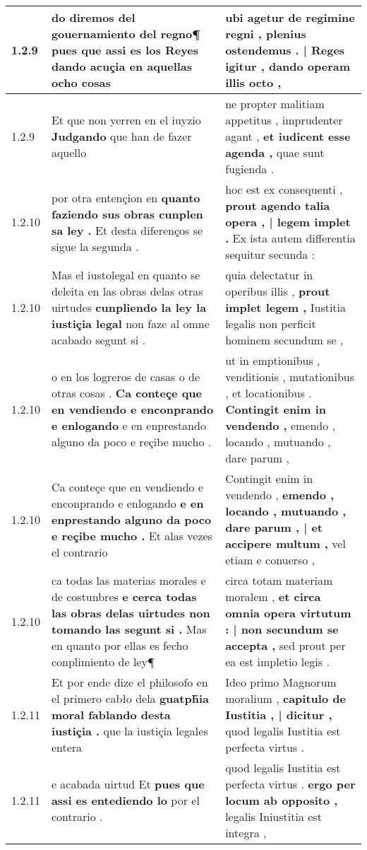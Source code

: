 \begin{tabular}{|p{1cm}|p{6.5cm}|p{6.5cm}|}
1.2.9 & do diremos del gouernamiento del regno¶ \textbf{ pues que assi es los Reyes dando acuçia } en aquellas ocho cosas & ubi agetur de regimine regni , \textbf{ plenius ostendemus . | Reges igitur , } dando operam illis octo , \\\hline
1.2.9 & Et que non yerren en el iuyzio \textbf{ Judgando } que han de fazer aquello & ne propter malitiam appetitus , imprudenter agant , \textbf{ et iudicent esse agenda , } quae sunt fugienda . \\\hline
1.2.10 & por otra entençion en \textbf{ quanto faziendo sus obras cunplen sa ley . } Et desta diferenços se sigue la segunda . & hoc est ex consequenti , \textbf{ prout agendo talia opera , | legem implet . } Ex ista autem differentia sequitur secunda : \\\hline
1.2.10 & Mas el iustolegal en quanto se deleita en las obras delas otras uirtudes \textbf{ cunpliendo la ley la iustiçia legal } non faze al omne acabado segunt si . & quia delectatur in operibus illis , \textbf{ prout implet legem , } Iustitia legalis non perficit hominem secundum se , \\\hline
1.2.10 & o en los logreros de casas o de otras cosas . \textbf{ Ca conteçe que en vendiendo e enconprando e enlogando } e en enprestando alguno da poco e reçibe mucho . & ut in emptionibus , venditionis , mutationibus , et locationibus . \textbf{ Contingit enim in vendendo , } emendo , locando , mutuando , dare parum , \\\hline
1.2.10 & Ca conteçe que en vendiendo e enconprando e enlogando \textbf{ e en enprestando alguno da poco e reçibe mucho . } Et alas vezes el contrario & Contingit enim in vendendo , \textbf{ emendo , locando , mutuando , dare parum , | et accipere multum , } vel etiam e conuerso , \\\hline
1.2.10 & ca todas las materias morales e de costunbres \textbf{ e cerca todas las obras delas uirtudes non tomando las segunt si . } Mas en quanto por ellas es fecho conplimiento de ley¶ & circa totam materiam moralem , \textbf{ et circa omnia opera virtutum : | non secundum se accepta , } sed prout per ea est impletio legis . \\\hline
1.2.11 & Et por ende dize el philosofo en el primero cabło dela \textbf{ guatph̃ia moral fablando desta iustiçia . } que la iustiçia legales entera & Ideo primo Magnorum moralium , \textbf{ capitulo de Iustitia , | dicitur , } quod legalis Iustitia est perfecta virtus . \\\hline
1.2.11 & e acabada uirtud Et \textbf{ pues que assi es entediendo lo } por el contrario . & quod legalis Iustitia est perfecta virtus . \textbf{ ergo per locum ab opposito , } legalis Iniustitia est integra , \\\hline

\end{tabular}

